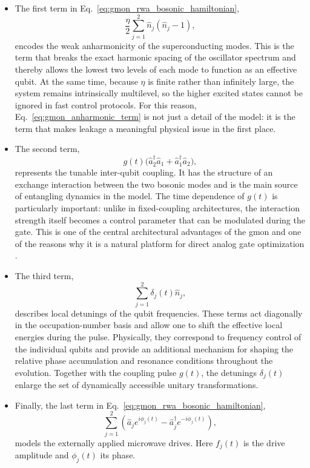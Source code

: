 \begin{itemize}
    \item The first term in Eq.~\eqref{eq:gmon_rwa_bosonic_hamiltonian},
\begin{equation}
\frac{\eta}{2}\sum_{j=1}^{2}\hat{n}_{j}(\hat{n}_{j}-1),
\label{eq:gmon_anharmonic_term}
\end{equation}
encodes the weak anharmonicity of the superconducting modes. This is the term that breaks the exact harmonic spacing of the oscillator spectrum and thereby allows the lowest two levels of each mode to function as an effective qubit. At the same time, because $\eta$ is finite rather than infinitely large, the system remains intrinsically multilevel, so the higher excited states cannot be ignored in fast control protocols. For this reason, Eq.~\eqref{eq:gmon_anharmonic_term} is not just a detail of the model: it is the term that makes leakage a meaningful physical issue in the first place.

\item The second term,
\begin{equation}
g(t)\bigl(\hat{a}_{2}^{\dagger}\hat{a}_{1}+\hat{a}_{1}^{\dagger}\hat{a}_{2}\bigr),
\label{eq:gmon_exchange_term}
\end{equation}
represents the tunable inter-qubit coupling. It has the structure of an exchange interaction between the two bosonic modes and is the main source of entangling dynamics in the model. The time dependence of $g(t)$ is particularly important: unlike in fixed-coupling architectures, the interaction strength itself becomes a control parameter that can be modulated during the gate. This is one of the central architectural advantages of the gmon and one of the reasons why it is a natural platform for direct analog gate optimization \cite{Chen2014,Niu2019}.

\item The third term,
\begin{equation}
\sum_{j=1}^{2}\delta_{j}(t)\hat{n}_{j},
\label{eq:gmon_detuning_term}
\end{equation}
describes local detunings of the qubit frequencies. These terms act diagonally in the occupation-number basis and allow one to shift the effective local energies during the pulse. Physically, they correspond to frequency control of the individual qubits and provide an additional mechanism for shaping the relative phase accumulation and resonance conditions throughout the evolution. Together with the coupling pulse $g(t)$, the detunings $\delta_j(t)$ enlarge the set of dynamically accessible unitary transformations.

\item Finally, the last term in Eq.~\eqref{eq:gmon_rwa_bosonic_hamiltonian},
\begin{equation}
\sum_{j=1}^{2}
\left(
\hat{a}_{j}e^{i\phi_{j}(t)}
-
\hat{a}_{j}^{\dagger}e^{-i\phi_{j}(t)}
\right),
\label{eq:gmon_drive_term}
\end{equation}
models the externally applied microwave drives. Here $f_j(t)$ is the drive amplitude and $\phi_j(t)$ its phase. 
\end{itemize}

